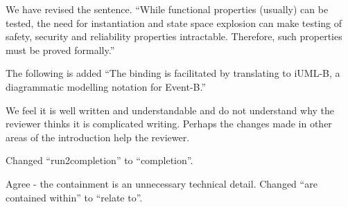 \documentclass{response}
\begin{document}
\begin{response}
  We have revised the sentence. ``While functional properties (usually) can be tested, the need for instantiation and state space explosion can make testing of safety, security and reliability properties intractable. Therefore, such properties must be proved formally.''
\end{response}

\begin{comment}{Reviewer \#3}
  Page 2:

  * Top: The first paragraph can be expressed more clearly. That is:
  what is the approach taken? Is UML state charts mapped to iUML-B or
  not?
\end{comment}

\begin{response}
  The following is added ``The binding is facilitated by translating to iUML-B, a diagrammatic modelling notation for Event-B.''
\end{response}

\begin{comment}{Reviewer \#3}
  Page 2:
  
  * Second paragraph appears complicated writing.
\end{comment}

\begin{response}
  We feel it is well written and understandable and do not understand why the reviewer thinks it is complicated writing. Perhaps the changes made in other areas of the introduction help the reviewer.
\end{response}

\begin{comment}{Reviewer \#3}
  Page 3:

* Listing 1: I think I would name that variable "run2completion" differently.
\end{comment}

\begin{response}
	Changed ``run2completion'' to ``completion''.
\end{response}


\begin{comment}{Reviewer \#3}
  Page 4:

  * Mid, it is not clear what this means:

  "The diagrammatic models are contained within an Event-B machine"
\end{comment}

\begin{response}
	Agree - the containment is an unnecessary technical detail. Changed ``are contained within'' to ``relate to''.
\end{response}
\end{document}
